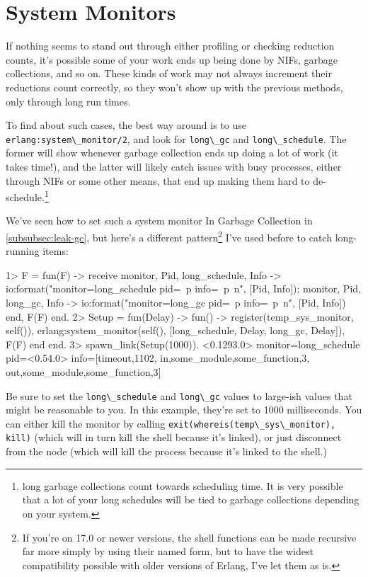 \documentclass[11pt, oneside]{book}   	%
\newcommand{\function}[1]{\Verb`#1`}
\newcommand{\expression}[1]{\Verb`#1`}
\newcommand{\term}[1]{\Verb`#1`}
\begin{document}
\section{System Monitors}
\label{sec:cpu-system-monitors}

If nothing seems to stand out through either profiling or checking reduction counts, it's possible some of your work ends up being done by NIFs, garbage collections, and so on. These kinds of work may not always increment their reductions count correctly, so they won't show up with the previous methods, only through long run times.

To find about such cases, the best way around is to use \function{erlang:system\_monitor/2}, and look for \term{long\_gc} and \term{long\_schedule}. The former will show whenever garbage collection ends up doing a lot of work (it takes time!), and the latter will likely catch issues with busy processes, either through NIFs or some other means, that end up making them hard to de-schedule.\footnote{long garbage collections count towards scheduling time. It is very possible that a lot of your long schedules will be tied to garbage collections depending on your system.}

We've seen how to set such a system monitor In Garbage Collection in \ref{subsubsec:leak-gc}, but here's a different pattern\footnote{If you're on 17.0 or newer versions, the shell functions can be made recursive far more simply by using their named form, but to have the widest compatibility possible with older versions of Erlang, I've let them as is.} I've used before to catch long-running items:

\begin{VerbatimEshell}
1> F = fun(F) ->
    receive
        {monitor, Pid, long_schedule, Info} ->
            io:format("monitor=long_schedule pid=~p info=~p~n", [Pid, Info]);
        {monitor, Pid, long_gc, Info} -> 
            io:format("monitor=long_gc pid=~p info=~p~n", [Pid, Info])
    end,
    F(F)
end.
2> Setup = fun(Delay) -> fun() -> 
     register(temp_sys_monitor, self()),
     erlang:system_monitor(self(), [{long_schedule, Delay}, {long_gc, Delay}]),
     F(F)
end end.
3> spawn_link(Setup(1000)).
<0.1293.0>
monitor=long_schedule pid=<0.54.0> info=[{timeout,1102},
                                         {in,{some_module,some_function,3}},
                                         {out,{some_module,some_function,3}}]
\end{VerbatimEshell}

Be sure to set the \term{long\_schedule} and \term{long\_gc} values to large-ish values that might be reasonable to you. In this example, they're set to 1000 milliseconds. You can either kill the monitor by calling \expression{exit(whereis(temp\_sys\_monitor), kill)} (which will in turn kill the shell because it's linked), or just disconnect from the node (which will kill the process because it's linked to the shell.)
\end{document}

